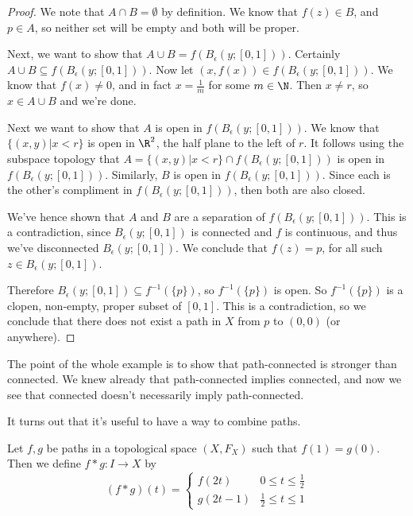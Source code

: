 \begin{proof}
 We note that $A\cap B = \emptyset$ by definition. We know that $f(z)\in B$, and $p\in A$, so neither set will be empty and both will be proper.
 
Next, we want to show that $A\cup B = f\left( B_\epsilon (y;[0,1]) \right)$. Certainly $A\cup B \subseteq f\left( B_{\epsilon} (y;[0,1]) \right)$. 
Now let $(x, f(x)) \in f\left( B_{\epsilon} (y;[0,1]) \right)$. We know that $f(x) \neq 0$, and in fact $x = \frac{1}{m}$ for some $m\in \N$. Then $x\neq r$, so $x\in A\cup B$ and we're done.

Next we want to show that $A$ is open in $f(B_{\epsilon} (y;[0,1]))$. We know that $\{(x,y) | x<r \}$ is open in $\R^2$, the half plane to the left of $r$. It follows using the subspace topology that $A = \{ (x,y) | x< r \} \cap f\left( B_{\epsilon} (y;[0,1]) \right)$ is open in $f\left( B_{\epsilon} (y;[0,1] ) \right)$. Similarly, $B$ is open in $f\left( B_{\epsilon} (y;[0,1] ) \right)$. Since each is the other's compliment in $f\left( B_{\epsilon} (y;[0,1] ) \right)$, then both are also closed.

We've hence shown that $A$ and $B$ are a separation of $f\left( B_{\epsilon} (y;[0,1] ) \right)$. This is a contradiction, since $B_{\epsilon} (y;[0,1])$ is connected and $f$ is continuous, and thus we've disconnected $B_{\epsilon}(y;[0,1])$. We conclude that $f(z) = p$, for all such $z\in B_{\epsilon}(y;[0,1])$. 

Therefore $B_{\epsilon} (y;[0,1]) \subseteq f^{-1}(\{ p\})$, so $f^{-1} (\{p\})$ is open. So $f^{-1}( \{ p \} )$ is a clopen, non-empty, proper subset of $[0,1]$. This is a contradiction, so we conclude that there does not exist a path in $X$ from $p$ to $(0,0)$ (or anywhere).
\end{proof}


The point of the whole example is to show that path-connected is stronger than connected. We knew already that path-connected implies connected, and now we see that connected doesn't necessarily imply path-connected.


It turns out that it's useful to have a way to combine paths.
\begin{definition} 
Let $f,g$ be paths in a topological space $(X,F_X)$ such that $f(1) = g(0)$. Then we define 
$f\ast g : I \to X$ by 
\[ (f\ast g )(t) =
\begin{cases}
f(2t) &  0 \leq t\leq \frac{1}{2} \\
g(2t-1) & \frac{1}{2} \leq t \leq 1
\end{cases} \]
\end{definition}

